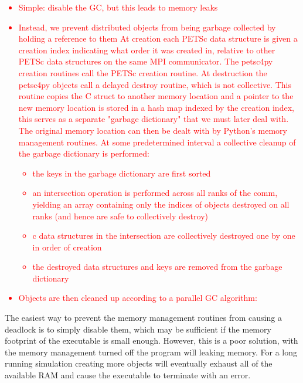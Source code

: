 \documentclass[10pt,journal,compsoc]{IEEEtran}
\newcommand{\jacknotes}[1]{\textcolor{red}{#1}}
\begin{document}
\jacknotes{
\begin{itemize}
	\item Simple: disable the GC, but this leads to memory leaks
	\item Instead, we prevent distributed objects from being garbage collected by holding a reference to them
	At creation each PETSc data structure is given a creation index indicating what order it was created in, relative to other PETSc data structures on the same MPI communicator. The petsc4py creation routines call the PETSc creation routine.
	At destruction the petsc4py objects call a delayed destroy routine, which is not collective.
	This routine copies the C struct to another memory location and a pointer to the new memory location is stored in a hash map indexed by the creation index, this serves as a separate "garbage dictionary" that we must later deal with.
	The original memory location can then be dealt with by Python's memory management routines.
	At some predetermined interval a collective cleanup of the garbage dictionary is performed:
	\begin{itemize}
	\item the keys in the garbage dictionary are first sorted
	\item an intersection operation is performed across all ranks of the comm, yielding an array containing only the indices of objects destroyed on all ranks (and hence are safe to collectively destroy)
	\item c data structures in the intersection are collectively destroyed one by one in order of creation
	\item the destroyed data structures and keys are removed from the garbage dictionary
\end{itemize}
	\item Objects are then cleaned up according to a parallel GC algorithm:
\end{itemize}
}

The easiest way to prevent the memory management routines from causing a deadlock is to simply disable them, which may be sufficient if the memory footprint of the executable is small enough.
However, this is a poor solution, with the memory management turned off the program will leaking memory.
For a long running simulation creating more objects will eventually exhaust all of the available RAM and cause the executable to terminate with an error.
\end{document}

